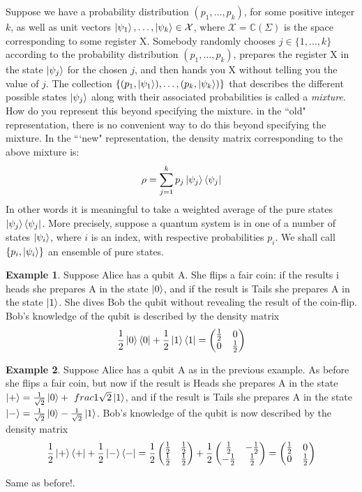 \documentclass[12pt, oneside]{book}
\theoremstyle{definition}
\theoremstyle{definition}
\newtheorem{example}{Example}[section]
\theoremstyle{remark}
\begin{document}
Suppose we have a probability distribution $(p_1,\ldots,p_k)$, for some positive integer $k$, as well as unit vectors $\ket{\psi_1},\ldots,\ket{\psi_k} \in \mathcal{X}$, where $\mathcal{X}=\mathbb{C}(\Sigma)$ is the space corresponding to some register X. Somebody randomly chooses $j \in \{1,\ldots,k\}$ according to the probability distribution $(p_1,\ldots,p_k)$, prepares the register X in the state $\ket{\psi_j}$ for the chosen $j$, and then hands you X without telling you the value of $j$. The collection $\{(p_1,\ket{\psi_1}),\ldots,(p_k,\ket{\psi_k})\}$ that describes the different possible states $\ket{\psi_j}$ along with their associated probabilities is called a \textit{mixture}. How do you represent this beyond specifying the mixture. in the ``old" representation, there is no convenient way to do this beyond specifying the mixture. In the ```new" representation, the density matrix corresponding to the above mixture is:
\[
\rho=\sum_{j=1}^k p_j \ket{\psi_j}\bra{\psi_j}
\]
In other words it is meaningful to take a weighted average of the pure states $\ket{\psi_j}\bra{\psi_j}$. More precisely, suppose a quantum system is in one of a number of states $\ket{\psi_i}$, where $i$ is an index, with respective probabilities $p_i$. We shall call $\{p_i,\ket{\psi_i}\}$ an ensemble of pure states.
\begin{example}
    Suppose Alice has a qubit A. She flips a fair coin: if the results i heads she prepares A in the state $\ket{0}$, and if the result is Tails she prepares A in the state $\ket{1}$. She dives Bob the qubit without revealing the result of the coin-flip. Bob's knowledge of the qubit is described by the density matrix
    \[
    \frac{1}{2}\ket{0}\bra{0}+ \frac{1}{2}\ket{1}\bra{1} = \begin{pmatrix} \frac{1}{2} & 0 \\ 0 & \frac{1}{2} \end{pmatrix} 
    \]
\end{example}
\begin{example}
    Suppose Alice has a qubit A as in the previous example. As before she flips a fair coin, but now if the result is Heads she prepares A in the state $\ket{+}=\frac{1}{\sqrt{2}} \ket{0} +\ frac{1}{\sqrt{2}}\ket{1}$, and if the result is Tails she prepares A in the state $\ket{-}=\frac{1}{\sqrt{2}}\ket{0}-\frac{1}{\sqrt{2}}\ket{1}$. Bob's knowledge of the qubit is now described by the density matrix
    \[
        \frac{1}{2}\ket{+}\bra{+} + \frac{1}{2}\ket{-}\bra{-} = \frac{1}{2}\begin{pmatrix} \frac{1}{2} & \frac{1}{2} \\ \frac{1}{2} & \frac{1}{2} \end{pmatrix}  + \frac{1}{2} \begin{pmatrix}  \frac{1}{2} & -\frac{1}{2} \\ -\frac{1}{2} & \frac{1}{2} \end{pmatrix}= \begin{pmatrix} \frac{1}{2} & 0 \\ 0 & \frac{1}{2} \end{pmatrix}
    \]
\end{example}
Same as before!.
\end{document}
